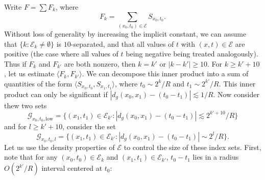 Write $F = \sum F_k$, where
%
\[ F_k = \sum_{(x_0,t_0) \in \mathcal{E}} {S\!}_{x_0,t_0}. \]
%
Without loss of generality by increasing the implicit constant, we can assume that $\{ k : \mathcal{E}_k \neq \emptyset \}$ is $10$-separated, and that all values of $t$ with $(x,t) \in \mathcal{E}$ are positive (the case where all values of $t$ being negative being treated analogously). Thus if $F_k$ and $F_{k'}$ are both nonzero, then $k = k'$ or $|k - k'| \geq 10$. For $k \geq k' + 10$, let us estimate $\langle F_k, F_{k'} \rangle$. We can decompose this inner product into a sum of quantities of the form $\langle {S\!}_{x_0,t_0}, {S\!}_{x_1,t_1} \rangle$, where $t_0 \sim 2^k / R$ and $t_1 \sim 2^{k'} / R$. This inner product can only be significant if $|d_g(x_0,x_1) - (t_0 - t_1)| \lesssim 1/R$. Now consider thew two sets
%
\[ \mathcal{G}_{x_0,t_0,\text{low}} = \{ (x_1,t_1) \in \mathcal{E}_{k'} : |d_g(x_0,x_1) - (t_0 - t_1)| \lesssim 2^{k' + 10} / R \} \]
%
and for $l \geq k' + 10$, consider the set
%
\[ \mathcal{G}_{x_0,t_0,l} = \{ (x_1,t_1) \in \mathcal{E}_{k'} : |d_g(x_0,x_1) - (t_0 - t_1)| \sim 2^l / R \}. \]
%
Let us use the density properties of $\mathcal{E}$ to control the size of these index sets. First, note that for any $(x_0,t_0) \in \mathcal{E}_k$ and $(x_1,t_1) \in \mathcal{E}_{k'}$, $t_0 - t_1$ lies in a radius $O(2^{k'} / R)$ interval centered at $t_0$:
%
